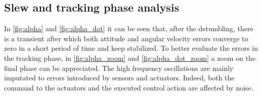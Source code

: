 \subsection{Slew and tracking phase analysis}
\label{subsec:slew_analysis}



In \autoref{fig:alpha} and \autoref{fig:alpha_dot} it can be seen that, after the detumbling, there is a transient after which both attitude and angular velocity errors converge to zero in a short period of time and keep stabilized.
To better evaluate the errors in the tracking phase, in \autoref{fig:alpha_zoom} and \autoref{fig:alpha_dot_zoom} a zoom on the final phase can be appreciated. The high frequency oscillations are mainly imputated to errors introduced by sensors and actuators. Indeed, both the command to the actuators and the executed control action are affected by noise.